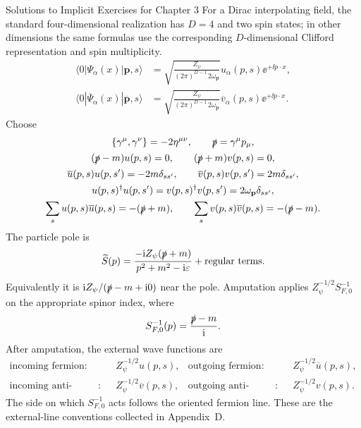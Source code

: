 \begin{bankssolutions}{Solutions to Implicit Exercises for Chapter 3}
For a Dirac interpolating field,
the standard four-dimensional realization has $D=4$ and two spin states; in
other dimensions the same formulas use the corresponding $D$-dimensional
Clifford representation and spin multiplicity.
\begin{align*}
 \langle0|\Psi_\alpha(x)|\mathbf p,s\rangle
 &=\sqrt{\frac{Z_\psi}{(2\pi)^{D-1}\,2\omega_{\mathbf p}}}
 u_\alpha(p,s)\ee^{+\ii p\mathbin{\cdot}x},\\
 \langle0|\overline\Psi_\alpha(x)|\overline{\mathbf p},s\rangle
 &=\sqrt{\frac{Z_\psi}{(2\pi)^{D-1}\,2\omega_{\mathbf p}}}
 \overline v_\alpha(p,s)\ee^{+\ii p\mathbin{\cdot}x}.
\end{align*}
Choose
\begin{gather*}
 \{\gamma^\mu,\gamma^\nu\}=-2\eta^{\mu\nu},
 \qquad \slashed p=\gamma^\mu p_\mu,\\
 (\slashed p-m)u(p,s)=0,
 \qquad (\slashed p+m)v(p,s)=0,\\
 \overline u(p,s)u(p,s')=-2m\delta_{ss'},
 \qquad \overline v(p,s)v(p,s')=2m\delta_{ss'},\\
 u(p,s)^\dagger u(p,s')=v(p,s)^\dagger v(p,s')
 =2\omega_{\mathbf p}\delta_{ss'},\\
 \sum_su(p,s)\overline u(p,s)=-(\slashed p+m),
 \qquad \sum_sv(p,s)\overline v(p,s)=-(\slashed p-m).
\end{gather*}
The particle pole is
\[
 \widetilde S(p)=\frac{-\mathrm{i} Z_\psi(\slashed p+m)}
 {p^2+m^2-\mathrm{i}\varepsilon}+\text{regular terms}.
\]
Equivalently it is $\mathrm{i} Z_\psi/(\slashed p-m+\mathrm{i}0)$ near the pole.  Amputation
applies $Z_\psi^{-1/2}S_{F,0}^{-1}$ on the appropriate spinor index, where
\[
 S_{F,0}^{-1}(p)=\frac{\slashed p-m}{\mathrm{i}}.
\]
After amputation, the external wave functions are
\[
 \begin{aligned}
 \text{incoming fermion}:&\quad Z_\psi^{-1/2}u(p,s),&
 \text{outgoing fermion}:&\quad Z_\psi^{-1/2}\overline u(p,s),\\
 \text{incoming anti-fermion}:&\quad Z_\psi^{-1/2}\overline v(p,s),&
 \text{outgoing anti-fermion}:&\quad Z_\psi^{-1/2}v(p,s).
 \end{aligned}
\]
The side on which $S_{F,0}^{-1}$ acts follows the oriented fermion line.  These
are the external-line conventions collected in Appendix~D.


\end{bankssolutions}

